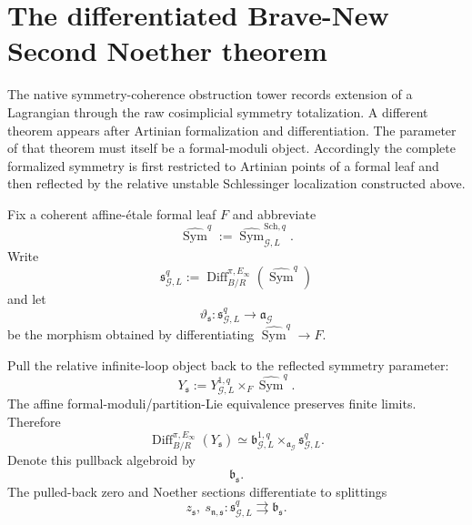 \section{The differentiated Brave-New Second Noether theorem}
\label{sec:symmetry-noether-the-differentiated-brave-new-second-noether-theorem}

The native symmetry-coherence obstruction tower records extension of a Lagrangian
through the raw cosimplicial symmetry totalization.  A different theorem appears after
Artinian formalization and differentiation.  The parameter of that theorem must
itself be a formal-moduli object.  Accordingly the complete formalized symmetry is
first restricted to Artinian points of a formal leaf and then reflected by the
relative unstable Schlessinger localization constructed above.

Fix a coherent affine-\'etale formal leaf $F$ and abbreviate
\[
\widehat{\operatorname{Sym}}^{q}
:=
\widehat{\operatorname{Sym}}_{\mathcal G,L}^{\mathrm{Sch},q}.
\]
Write
\[
\mathfrak s_{\mathcal G,L}^{q}
:=
\operatorname{Diff}^{\pi,E_\infty}_{B/R}
\left(
\widehat{\operatorname{Sym}}^{q}
\right)
\]
and let
\[
\vartheta_{\mathfrak s}:
\mathfrak s_{\mathcal G,L}^{q}
\longrightarrow
\mathfrak a_{\mathcal G}
\]
be the morphism obtained by differentiating
$\widehat{\operatorname{Sym}}^{q}\to F$.

\begin{construction}
\label{constr:symmetry-noether-base-changed-retractive-noether-algebroid}
Pull the relative infinite-loop object back to the reflected symmetry parameter:
\[
Y_{\mathfrak s}
:=
Y_{\mathcal G,L}^{1,q}
\times_F
\widehat{\operatorname{Sym}}^{q}.
\]
The affine formal-moduli/partition-Lie equivalence preserves finite limits.
Therefore
\[
\operatorname{Diff}^{\pi,E_\infty}_{B/R}(Y_{\mathfrak s})
\simeq
\mathfrak b_{\mathcal G,L}^{1,q}
\times_{\mathfrak a_{\mathcal G}}
\mathfrak s_{\mathcal G,L}^{q}.
\]
Denote this pullback algebroid by
\[
\mathfrak b_{\mathfrak s}.
\]
The pulled-back zero and Noether sections differentiate to splittings
\[
z_{\mathfrak s},\ s_{\mathfrak n,\mathfrak s}:
\mathfrak s_{\mathcal G,L}^{q}
\rightrightarrows
\mathfrak b_{\mathfrak s}.
\]
\end{construction}

